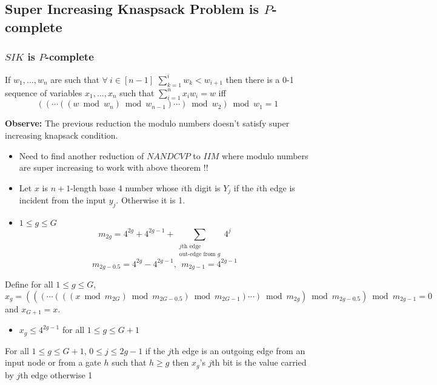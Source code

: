 \documentclass[article,10pt]{beamer}%
\begin{document}
\subsection{Super Increasing Knaspsack Problem is $P$-complete}
\begin{frame}[allowframebreaks]
\frametitle{$SIK$ is $P$-complete}
\begin{theorem}
	If $w_1,\dots, w_n$ are such that $\forall \ i\in [n-1]$ $\sum\limits_{k=1}^{i}w_k<w_{i+1}$ then there is a 0-1 sequence of variables $x_1,\dots, x_n$ such that $\sum\limits_{i=1}^nx_iw_i=w$ iff $$((\cdots((w\bmod{w_n})\bmod{w_{n-1}})\cdots )\bmod{w_2})\bmod{w_1}=1$$
\end{theorem}
\framebreak

\textbf{Observe:} The previous reduction the modulo numbers doesn't satisfy super increasing knapsack condition.
\vspace{5mm}

\begin{itemize}
	\item Need to find another reduction of $NANDCVP$ to $IIM$ where modulo numbers are super increasing to work with above theorem !!
\end{itemize}

\framebreak

\begin{itemize}
	\item Let $x$ is $n+1$-length base 4 number whose $i$th digit is $Y_j$ if the $i$th edge is incident from the input $y_j$. Otherwise it is 1.
	\item $1\leq g\leq G$  $$m_{2g}=4^{2g}+4^{2g-1}+\sum_{\substack{j\text{th edge}\\ \text{out-edge from }g}}4^j$$ $$m_{2g-0.5}=4^{2g}-4^{2g-1},\ \ m_{2g-1}=4^{2g-1}$$
\end{itemize}
\framebreak
Define for all $1\leq g\leq  G$,\\
 $x_g=(((\cdots (((x\bmod{m_{2G}})\bmod{m_{2G-0.5}})\bmod{m_{2G-1}})\cdots)\bmod{m_{2g}})\bmod{m_{2g-0.5}})\bmod{m_{2g-1}}=0$ and $x_{G+1}=x$.\vspace{5mm}
\begin{itemize}
	\item $x_g\leq 4^{2g-1}$ for all $1\leq g \leq G+1$
\end{itemize}
\framebreak


	\begin{theorem}
		For all $1\leq g\leq G+1$, $0\leq j\leq 2g-1$ if the $j$th edge is an outgoing edge from an input node or from a gate $h$ such that $h\geq g$ then $x_g$'s $j$th bit is the value carried by $j$th edge 		otherwise 1
	\end{theorem}
	\framebreak
	

\end{frame}
\end{document}
